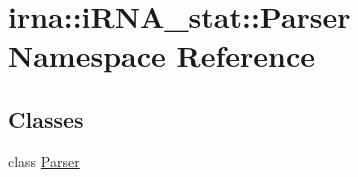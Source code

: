 \hypertarget{namespaceirna_1_1iRNA__stat_1_1Parser}{
\section{irna\-:\-:i\-R\-N\-A\-\_\-stat\-:\-:\-Parser \-Namespace \-Reference}
\label{namespaceirna_1_1iRNA__stat_1_1Parser}
}
\subsection*{\-Classes}
\begin{DoxyCompactItemize}
\item 
class \hyperlink{classirna_1_1iRNA__stat_1_1Parser_1_1Parser}{\-Parser}
\end{DoxyCompactItemize}
